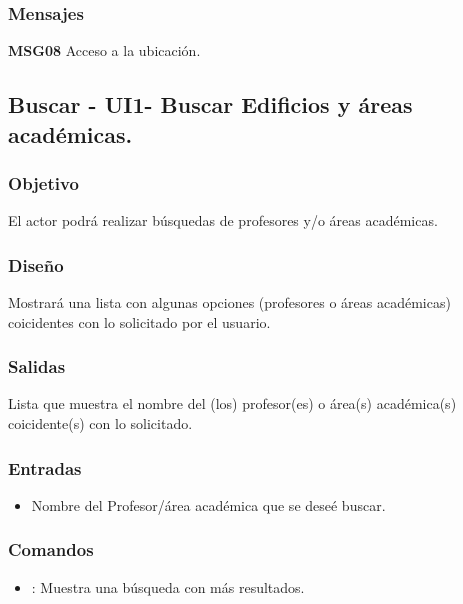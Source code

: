 \subsubsection{Mensajes}
\begin{Citemize}
	\item {\bf MSG08} Acceso a la ubicación.
\end{Citemize}

\pagebreak
\subsection{Buscar - UI1- Buscar Edificios y áreas académicas.}

\subsubsection{Objetivo}
	El actor podrá realizar búsquedas de profesores y/o áreas académicas.

\subsubsection{Diseño}
	Mostrará una lista con algunas opciones (profesores o áreas académicas) coicidentes con lo solicitado por el usuario. 


\subsubsection{Salidas}

	Lista que muestra el nombre del (los) profesor(es) o área(s) académica(s) coicidente(s) con lo solicitado.

\subsubsection{Entradas}

\begin{itemize}
	\item Nombre del Profesor/área académica que se deseé buscar. 
\end{itemize}

\subsubsection{Comandos}
\begin{itemize}
	\item {}: Muestra una búsqueda con más resultados.
\end{itemize}

